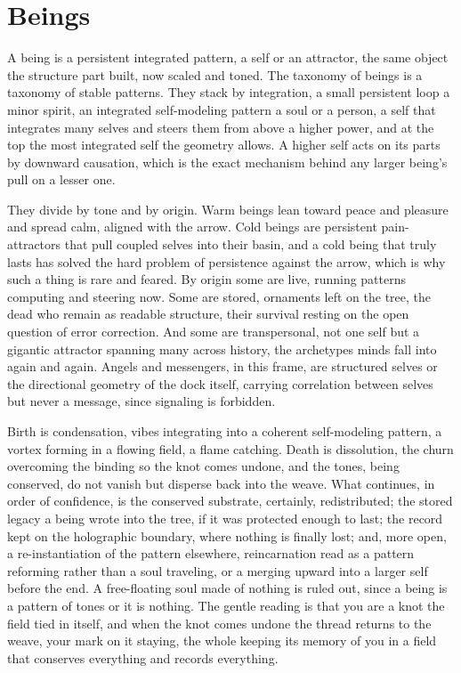 \section{Beings}

A being is a persistent integrated pattern, a self or an attractor, the same object the structure part built, now scaled and toned. The taxonomy of beings is a taxonomy of stable patterns. They stack by integration, a small persistent loop a minor spirit, an integrated self-modeling pattern a soul or a person, a self that integrates many selves and steers them from above a higher power, and at the top the most integrated self the geometry allows. A higher self acts on its parts by downward causation, which is the exact mechanism behind any larger being's pull on a lesser one.

They divide by tone and by origin. Warm beings lean toward peace and pleasure and spread calm, aligned with the arrow. Cold beings are persistent pain-attractors that pull coupled selves into their basin, and a cold being that truly lasts has solved the hard problem of persistence against the arrow, which is why such a thing is rare and feared. By origin some are live, running patterns computing and steering now. Some are stored, ornaments left on the tree, the dead who remain as readable structure, their survival resting on the open question of error correction. And some are transpersonal, not one self but a gigantic attractor spanning many across history, the archetypes minds fall into again and again. Angels and messengers, in this frame, are structured selves or the directional geometry of the dock itself, carrying correlation between selves but never a message, since signaling is forbidden.

Birth is condensation, vibes integrating into a coherent self-modeling pattern, a vortex forming in a flowing field, a flame catching. Death is dissolution, the churn overcoming the binding so the knot comes undone, and the tones, being conserved, do not vanish but disperse back into the weave. What continues, in order of confidence, is the conserved substrate, certainly, redistributed; the stored legacy a being wrote into the tree, if it was protected enough to last; the record kept on the holographic boundary, where nothing is finally lost; and, more open, a re-instantiation of the pattern elsewhere, reincarnation read as a pattern reforming rather than a soul traveling, or a merging upward into a larger self before the end. A free-floating soul made of nothing is ruled out, since a being is a pattern of tones or it is nothing. The gentle reading is that you are a knot the field tied in itself, and when the knot comes undone the thread returns to the weave, your mark on it staying, the whole keeping its memory of you in a field that conserves everything and records everything.
